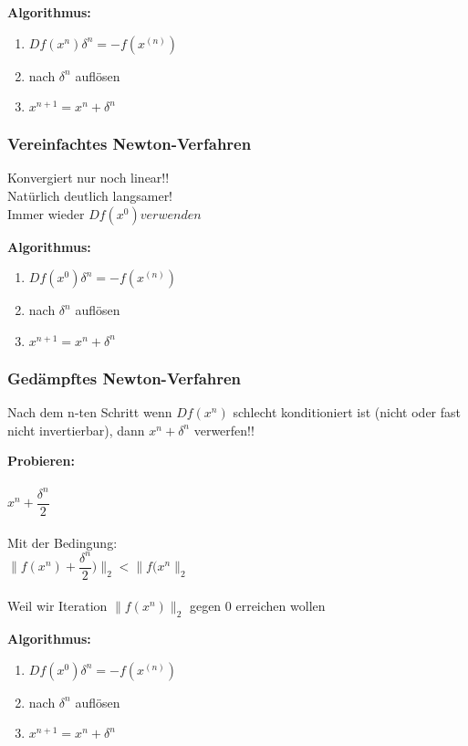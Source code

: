 \documentclass[../ZF_HM2.tex]{subfiles}
\begin{document}
\begin{mdframed}
	\textbf{Algorithmus:\\}
	\begin{enumerate}
		\item $Df(x^{n})\delta ^{n} = -f(x^{(n)})$
		\item nach $\delta ^{n}$ auflösen
		\item $x^{n+1} = x^{n} +\delta ^{n} $
	\end{enumerate}
\end{mdframed}

\subsubsection{Vereinfachtes Newton-Verfahren}
Konvergiert nur noch linear!!\\
Natürlich deutlich langsamer!\\

Immer wieder $Df(x^{0}) verwenden$

\begin{mdframed}
	\textbf{Algorithmus:\\}
	\begin{enumerate}
		\item $Df(x^{0})\delta ^{n} = -f(x^{(n)})$
		\item nach $\delta ^{n}$ auflösen
		\item $x^{n+1} = x^{n} +\delta ^{n} $
	\end{enumerate}
\end{mdframed}



\subsubsection{Gedämpftes Newton-Verfahren}

Nach dem n-ten Schritt wenn $Df(x^{n})$ schlecht konditioniert ist (nicht oder fast nicht invertierbar), dann $x^{n} +\delta ^{n}$ verwerfen!!

\begin{mdframed}
	\textbf{Probieren:\\\\}
	$x^{n} + \dfrac{\delta ^{n}} {2}$\\\\
	Mit der Bedingung:\\
	$\|f(x^{n}) + \dfrac{\delta ^{n}} {2})\|_2 < \|f(x^{n} \|_2$ \\\\
	Weil wir Iteration $\|f(x^{n}) \|_2$ gegen 0 erreichen wollen
	 
\end{mdframed}


\begin{mdframed}
	\textbf{Algorithmus:\\}
	\begin{enumerate}
		\item $Df(x^{0})\delta ^{n} = -f(x^{(n)})$
		\item nach $\delta ^{n}$ auflösen
		\item $x^{n+1} = x^{n} +\delta ^{n} $
	\end{enumerate}
\end{mdframed}
\end{document}
